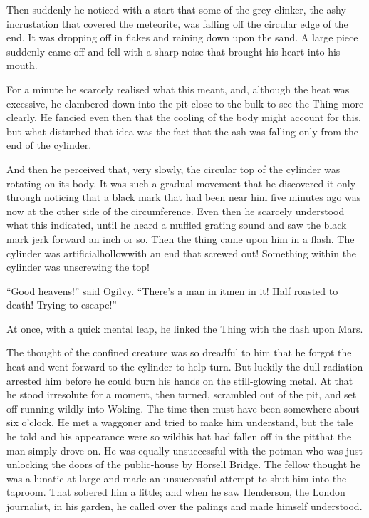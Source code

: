 Then suddenly he noticed with a start that some of the grey
clinker, the ashy incrustation that covered the meteorite, was
falling off the circular edge of the end. It was dropping off in
flakes and raining down upon the sand. A large piece suddenly came
off and fell with a sharp noise that brought his heart into his
mouth.

For a minute he scarcely realised what this meant, and, although
the heat was excessive, he clambered down into the pit close to the
bulk to see the Thing more clearly. He fancied even then that the
cooling of the body might account for this, but what disturbed that
idea was the fact that the ash was falling only from the end of the
cylinder.

And then he perceived that, very slowly, the circular top of the
cylinder was rotating on its body. It was such a gradual movement
that he discovered it only through noticing that a black mark that
had been near him five minutes ago was now at the other side of the
circumference. Even then he scarcely understood what this
indicated, until he heard a muffled grating sound and saw the black
mark jerk forward an inch or so. Then the thing came upon him in a
flash. The cylinder was artificial\dash{}hollow\dash{}with an end that
screwed out! Something within the cylinder was unscrewing the top!

``Good heavens!'' said Ogilvy. ``There's a man in it\dash{}men in it! Half
roasted to death! Trying to escape!''

At once, with a quick mental leap, he linked the Thing with the
flash upon Mars.

The thought of the confined creature was so dreadful to him that he
forgot the heat and went forward to the cylinder to help turn. But
luckily the dull radiation arrested him before he could burn his
hands on the still-glowing metal. At that he stood irresolute for a
moment, then turned, scrambled out of the pit, and set off running
wildly into Woking. The time then must have been somewhere about
six o'clock. He met a waggoner and tried to make him understand,
but the tale he told and his appearance were so wild\dash{}his hat had
fallen off in the pit\dash{}that the man simply drove on. He was equally
unsuccessful with the potman who was just unlocking the doors of
the public-house by Horsell Bridge. The fellow thought he was a
lunatic at large and made an unsuccessful attempt to shut him into
the taproom. That sobered him a little; and when he saw Henderson,
the London journalist, in his garden, he called over the palings
and made himself understood.

